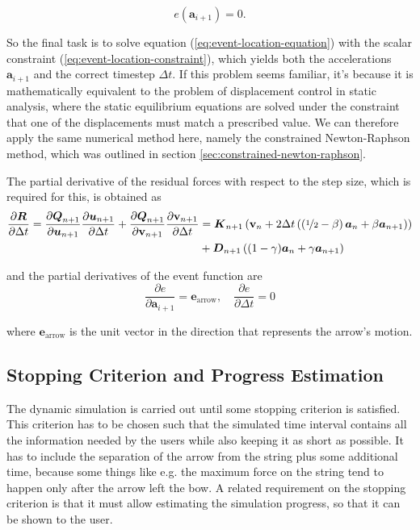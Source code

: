 \begin{equation}
e(\boldsymbol{a}_{i+1}) = 0. \label{eq:event-location-constraint}
\end{equation}

So the final task is to solve equation (\ref{eq:event-location-equation}) with the scalar constraint (\ref{eq:event-location-constraint}), which yields both the accelerations $\boldsymbol{a}_{i+1}$ and the correct timestep $\Delta t$.
If this problem seems familiar, it's because it is mathematically equivalent to the problem of displacement control in static analysis, where the static equilibrium equations are solved under the constraint that one of the displacements must match a prescribed value.
We can therefore apply the same numerical method here, namely the constrained Newton-Raphson method, which was outlined in section \ref{sec:constrained-newton-raphson}.

The partial derivative of the residual forces with respect to the step size, which is required for this, is obtained as
%
\begin{align}
\frac{\partial \boldsymbol{R}}{\partial \Delta t} = \frac{\partial \boldsymbol{Q}_{n+1}}{\partial \boldsymbol{u}_{n+1}}\frac{\partial \boldsymbol{u}_{n+1}}{\partial \Delta t} + \frac{\partial \boldsymbol{Q}_{n+1}}{\partial \boldsymbol{\mathrm{v}}_{n+1}}\frac{\partial \boldsymbol{\mathrm{v}}_{n+1}}{\partial \Delta t} &= \boldsymbol{K}_{n+1}\left(\boldsymbol{\mathrm{v}}_{n} + 2\Delta t\left(\left(\nicefrac{1}{2} - \beta\right)\boldsymbol{a}_{n} + \beta \boldsymbol{a}_{n+1}\right) \right) \notag \\
&+ \boldsymbol{D}_{n+1}\left((1 - \gamma)\boldsymbol{a}_{n} + \gamma\boldsymbol{a}_{n+1}\right)
\end{align}

and the partial derivatives of the event function are
%
\begin{equation}
\frac{\partial e}{\partial\boldsymbol{a}_{i+1}} = \boldsymbol{e}_{\mathrm{arrow}}, \quad \frac{\partial e}{\partial\Delta t} = 0
\end{equation}

where $\boldsymbol{e}_{\mathrm{arrow}}$ is the unit vector in the direction that represents the arrow's motion.

\newpage
\subsection{Stopping Criterion and Progress Estimation}

The dynamic simulation is carried out until some stopping criterion is satisfied.
This criterion has to be chosen such that the simulated time interval contains all the information needed by the users while also keeping it as short as possible.
It has to include the separation of the arrow from the string plus some additional time, because some things like e.g. the maximum force on the string tend to happen only after the arrow left the bow.
A related requirement on the stopping criterion is that it must allow estimating the simulation progress, so that it can be shown to the user.

